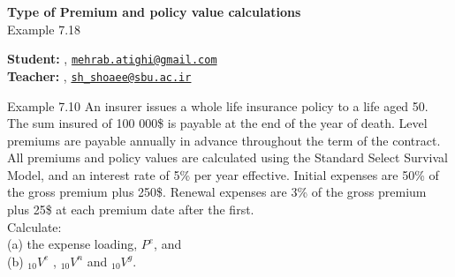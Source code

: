 


\usepackage{actuarialsymbol}


	\begin{Large}
		\textsf{\textbf{Type of Premium and policy value calculations}}\\
		Example 7.18
	\end{Large}
	
	\vspace{1ex}
	
	\textsf{\textbf{Student:}} , \href{mailto:mehrab.atighi@gmail.com}{\texttt{mehrab.atighi@gmail.com}}\\
	\textsf{\textbf{Teacher:}} , \href{mailto:sh_shoaee@sbu.ac.ir}{\texttt{sh\_shoaee@sbu.ac.ir}}
	
	\vspace{2ex}
	
	\begin{problem}{}{Example 7.10}
		An insurer issues a whole life insurance policy to a life aged 50. The sum insured of 100 000\$ is payable at the end of the year of death. Level premiums are payable annually in advance throughout the term of the contract. All premiums and policy values are calculated using the Standard Select Survival Model, and an interest rate of 5\% per year effective. Initial expenses are 50\% of the gross premium plus 250\$. Renewal expenses are 3\% of the gross premium plus 25\$ at each premium date after the first.\\
		Calculate:\\
		(a) the expense loading, $P^e$, and\\
		(b) $_{10}V^e$ , $_{10}V^n$ and $_{10}V^g$.
	\end{problem}
	
